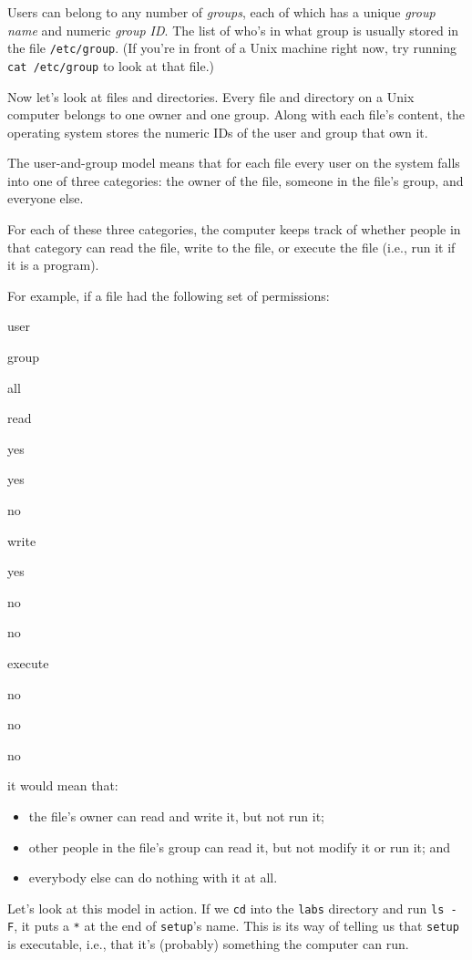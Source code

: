 \documentclass[]{book}
\newcommand{\gdef}[2]{\emph{#2}}
\begin{document}
Users can belong to any number of \gdef{g:user-group}{groups}, each
of which has a unique \gdef{g:user-group-name}{group name} and
numeric \gdef{g:user-group-id}{group ID}. The list of who's in what
group is usually stored in the file \texttt{/etc/group}. (If you're in
front of a Unix machine right now, try running \texttt{cat /etc/group}
to look at that file.)

Now let's look at files and directories. Every file and directory on a
Unix computer belongs to one owner and one group. Along with each file's
content, the operating system stores the numeric IDs of the user and
group that own it.

The user-and-group model means that for each file every user on the
system falls into one of three categories: the owner of the file,
someone in the file's group, and everyone else.

For each of these three categories, the computer keeps track of whether
people in that category can read the file, write to the file, or execute
the file (i.e., run it if it is a program).

For example, if a file had the following set of permissions:

user

group

all

read

yes

yes

no

write

yes

no

no

execute

no

no

no

it would mean that:

\begin{itemize}
\item
  the file's owner can read and write it, but not run it;
\item
  other people in the file's group can read it, but not modify it or run
  it; and
\item
  everybody else can do nothing with it at all.
\end{itemize}

Let's look at this model in action. If we \texttt{cd} into the
\texttt{labs} directory and run \texttt{ls -F}, it puts a \texttt{*} at
the end of \texttt{setup}'s name. This is its way of telling us that
\texttt{setup} is executable, i.e., that it's (probably) something the
computer can run.
\end{document}
